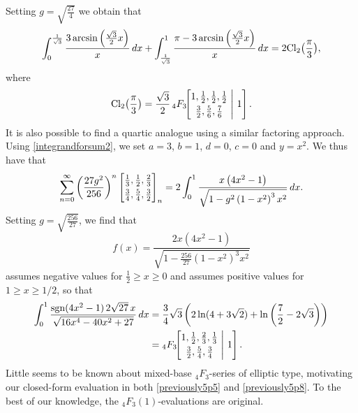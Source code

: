\documentclass[12pt]{article}
\begin{document}
 Setting $g = \sqrt{\frac{27}{4}}$ we obtain that 
\begin{equation*}
\int_{0}^{\frac{1}{\sqrt{3}}} \frac{3 \arcsin\left(\frac{\sqrt{3}}{2}x\right)}{x} \, dx + \int_{\frac{1}{\sqrt{3}}}^{1} \frac{\pi - 3 \arcsin\left(\frac{\sqrt{3}}{2}x\right)}{x} \, dx =2\rm{Cl}_2\big(\frac{\pi}3\big), 
\end{equation*}
 where 
\begin{equation}\label{previously5p5}
 \text{Cl}_2\big(\frac{\pi}3\big) = 
 \frac{ \sqrt{3}}{ 2} \, {}_{4}F_{3}\!\!\left[ \begin{matrix} 
 1, \frac{1}{2}, \frac{1}{2}, \frac{1}{2} \vspace{1mm}\\ 
 \frac{3}{2}, \frac{5}{6}, \frac{7}{6} \end{matrix} \ \Bigg| \ 1 \right]. 
\end{equation}
 It is also possible to find a quartic analogue using a similar factoring approach. Using \eqref{integrandforsum2}, we set 
 $a = 3$, $b = 1$, $d = 0$, $c = 0$ and $y = x^2$. We thus have that 
\begin{equation*}
 \sum_{n = 0}^{\infty} \left( \frac{27g^2}{256} \right)^{n} 
 \left[ \begin{matrix} \frac{1}{3}, \frac{1}{2}, \frac{2}{3} 
 \vspace{1mm} \\ 
 \frac{3}{4}, \frac{5}{4}, \frac{3}{2} \end{matrix} \right]_{n} 
 = 2 \int_0^1 \frac{x \left( 4x^2 - 1 \right)}{\sqrt{1 - g^2 \left( 1 - x^2 \right)^3 x^2}} \, dx. 
\end{equation*}
 Setting $g=\sqrt{\frac{256}{27}}$, we find that 
\begin{equation*}
 f(x)= \frac{2x \left( 4x^2 - 1 \right)}{\sqrt{1 - \frac{256}{27} \left(1 - x^2\right)^3 x^2}}
\end{equation*}
 assumes negative values for $ \frac{1}{2} \geq x \geq 0 $ 
 and assumes positive values for $ 1 \geq x \geq 1/2 $, so that 
\begin{align}
\begin{split}
 \int_0^1 
 \frac{\text{sgn}(4x^2 - 1) \, 
 2\sqrt{27} \, x}{\sqrt{16x^4 - 40x^2 + 27}} \, dx 
 & = \frac{3}{4} \sqrt{3} \left( 2 \ln(4 + 3\sqrt{2}) + \ln\left(\frac{7}{2} - 2\sqrt{3}\right) \right) \\ 
 & = {}_{4}F_{3}\!\!\left[ \begin{matrix} 
 1, \frac{1}{2}, \frac{2}{3}, \frac{1}{3} \vspace{1mm}\\ 
 \frac{3}{2}, \frac{5}{4}, \frac{3}{4} \end{matrix} \ \Bigg| \ 1 \right]. 
\end{split}\label{previously5p8}
\end{align}
 Little seems to be known about mixed-base ${}_{4}F_{3}$-series of elliptic type, motivating our closed-form evaluation in both 
 \eqref{previously5p5} and \eqref{previously5p8}. To the best of our knowledge, the ${}_{4}F_{3}(1)$-evaluations are original. 
\end{document}
